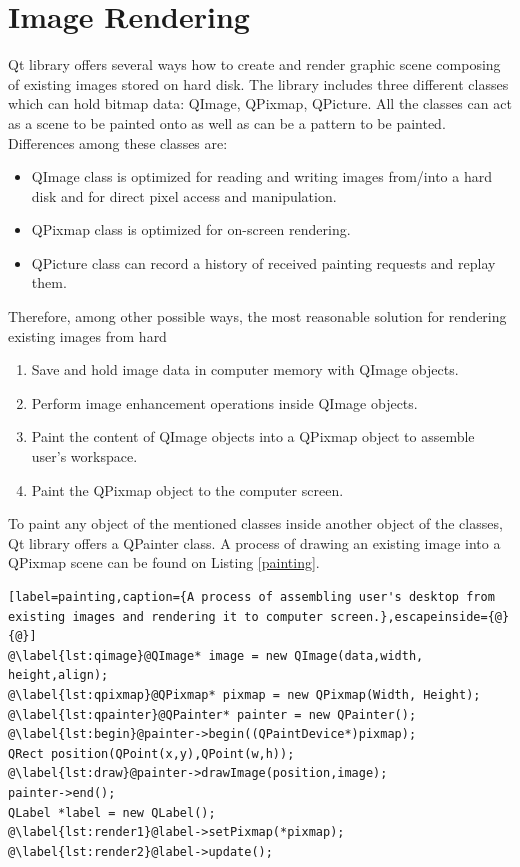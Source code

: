 \section{Image Rendering}
\label{rendering}
Qt library offers several ways how to create and render graphic scene composing of existing images stored on hard disk. The library includes three different classes which can hold bitmap data: QImage, QPixmap, QPicture. All the classes can act as a scene to be painted onto as well as can be a pattern to be painted. Differences among these classes are\cite{QtDoc}:

\begin{itemize}
\item QImage class is optimized for reading and writing images from/into a hard disk and for direct pixel access and manipulation.
\item QPixmap class is optimized for on-screen rendering.
\item QPicture class can record a history of received painting requests and replay them.
\end{itemize}

Therefore, among other possible ways, the most reasonable solution for rendering existing images from hard

\begin{enumerate}
  \item Save and hold image data in computer memory with QImage objects.
  \item Perform image enhancement operations inside QImage objects.
  \item Paint the content of QImage objects into a QPixmap object to assemble user's workspace.
  \item Paint the QPixmap object to the computer screen.
\end{enumerate}

To paint any object of the mentioned classes inside another object of the classes, Qt library offers a QPainter class. A process of drawing an existing image into a QPixmap scene can be found on Listing \ref{painting}.

\begin{lstlisting}[label=painting,caption={A process of assembling user's desktop from existing images and rendering it to computer screen.},escapeinside={@}{@}]
@\label{lst:qimage}@QImage* image = new QImage(data,width, height,align);
@\label{lst:qpixmap}@QPixmap* pixmap = new QPixmap(Width, Height);
@\label{lst:qpainter}@QPainter* painter = new QPainter();
@\label{lst:begin}@painter->begin((QPaintDevice*)pixmap);
QRect position(QPoint(x,y),QPoint(w,h));
@\label{lst:draw}@painter->drawImage(position,image);
painter->end();
QLabel *label = new QLabel();
@\label{lst:render1}@label->setPixmap(*pixmap);
@\label{lst:render2}@label->update();
\end{lstlisting}

